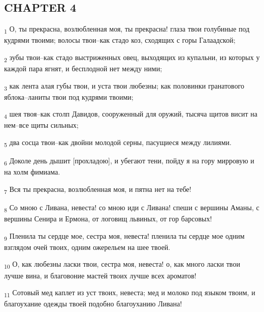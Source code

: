 \subsection{CHAPTER 4}
\begin{tcolorbox}
\textsubscript{1} О, ты прекрасна, возлюбленная моя, ты прекрасна! глаза твои голубиные под кудрями твоими; волосы твои--как стадо коз, сходящих с горы Галаадской;
\end{tcolorbox}
\begin{tcolorbox}
\textsubscript{2} зубы твои--как стадо выстриженных овец, выходящих из купальни, из которых у каждой пара ягнят, и бесплодной нет между ними;
\end{tcolorbox}
\begin{tcolorbox}
\textsubscript{3} как лента алая губы твои, и уста твои любезны; как половинки гранатового яблока--ланиты твои под кудрями твоими;
\end{tcolorbox}
\begin{tcolorbox}
\textsubscript{4} шея твоя--как столп Давидов, сооруженный для оружий, тысяча щитов висит на нем--все щиты сильных;
\end{tcolorbox}
\begin{tcolorbox}
\textsubscript{5} два сосца твои--как двойни молодой серны, пасущиеся между лилиями.
\end{tcolorbox}
\begin{tcolorbox}
\textsubscript{6} Доколе день дышит [прохладою], и убегают тени, пойду я на гору мирровую и на холм фимиама.
\end{tcolorbox}
\begin{tcolorbox}
\textsubscript{7} Вся ты прекрасна, возлюбленная моя, и пятна нет на тебе!
\end{tcolorbox}
\begin{tcolorbox}
\textsubscript{8} Со мною с Ливана, невеста! со мною иди с Ливана! спеши с вершины Аманы, с вершины Сенира и Ермона, от логовищ львиных, от гор барсовых!
\end{tcolorbox}
\begin{tcolorbox}
\textsubscript{9} Пленила ты сердце мое, сестра моя, невеста! пленила ты сердце мое одним взглядом очей твоих, одним ожерельем на шее твоей.
\end{tcolorbox}
\begin{tcolorbox}
\textsubscript{10} О, как любезны ласки твои, сестра моя, невеста! о, как много ласки твои лучше вина, и благовоние мастей твоих лучше всех ароматов!
\end{tcolorbox}
\begin{tcolorbox}
\textsubscript{11} Сотовый мед каплет из уст твоих, невеста; мед и молоко под языком твоим, и благоухание одежды твоей подобно благоуханию Ливана!
\end{tcolorbox}

